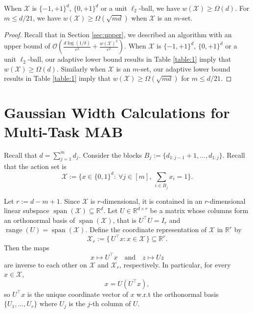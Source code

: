 \begin{proposition}
    When $\mathcal{X}$ is $\{-1,+1\}^d$, $\{0,+1\}^d$ or a unit $\ell_2$-ball, we have $w(\mathcal{X})\geq\Omega(d)$. For $m\leq d/21$, we have $w(\mathcal{X})\geq \Omega(\sqrt{md})$ when $\mathcal{X}$ is an $m$-set.
\end{proposition}
\begin{proof}
    Recall that in Section \ref{sec:upper}, we described an algorithm with an upper bound of $\mathcal{O}\left(\frac{d\log(1/\delta)}{\varepsilon^2}+\frac{w(\mathcal{X})^2}{\varepsilon^2}\right).$
    When $\mathcal{X}$ is $\{-1,+1\}^d$, $\{0,+1\}^d$ or a unit $\ell_2$-ball, our adaptive lower bound results in Table \ref{table:1} imply that $w(\mathcal{X})\geq \Omega(d)$. Similarly when $\mathcal{X}$ is an $m$-set, our adaptive lower bound results in Table \ref{table:1} imply that $w(\mathcal{X})\geq \Omega(\sqrt{md})$ for $m\leq d/21$.
\end{proof}

\section{Gaussian Width Calculations for Multi-Task MAB}\label{appendix:gaussian-width-multi-task-MAB}
Recall that \(d=\sum_{j=1}^m d_j\). Consider the blocks \(B_j:=\{d_{1:j-1}+1,\dots,d_{1:j}\}\).  Recall that the action set is
\begin{equation}\label{eq:action-set}
\mathcal{X}:=\Big\{x\in\{0,1\}^d:\ \forall j\in[m],\ \sum_{i\in B_j}x_i=1\Big\}.\nonumber
\end{equation}

Let $r := d-m+1$. Since $\mathcal X$ is $r$-dimensional, it is contained in an $r$-dimensional linear subspace
$ \operatorname{span}(\mathcal X)\subseteq \mathbb R^d$.
Let $U\in\mathbb R^{d\times r}$ be a matrix whose columns form an orthonormal basis of $\operatorname{span}(\mathcal X)$, that is $U^\top U = I_r$ and $\operatorname{range}(U)=\operatorname{span}(\mathcal X)$.
Define the coordinate representation of $\mathcal X$ in $\mathbb R^r$ by
\[
\mathcal X_r := \{\,U^\top x : x\in \mathcal X\,\}\subseteq \mathbb R^r.
\]
Then the maps
\[
x \mapsto U^\top x \quad\text{and}\quad z \mapsto Uz
\]
are inverse to each other on $\mathcal X$ and $\mathcal X_r$, respectively. In particular, for every $x\in \mathcal X$,
\[
x = U(U^\top x),
\]
so $U^\top x$ is the unique coordinate vector of $x$ w.r.t the orthonormal basis $\{U_1,\ldots,U_r\}$ where $U_j$ is the $j$-th column of $U$.


